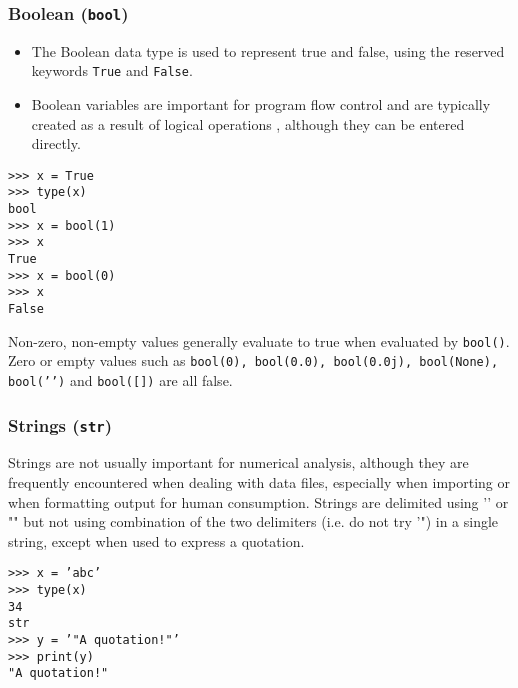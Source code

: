 \documentclass[KSmain.tex]{subfiles}
\begin{document}
\subsubsection{Boolean (\texttt{bool})}
\begin{itemize}
\item The Boolean data type is used to represent true and false, using the reserved keywords \texttt{True} and \texttt{False}.
\item Boolean variables are important for program flow control and are typically created as a
result of logical operations , although they can be entered directly.
\end{itemize}
\begin{framed}
\begin{verbatim}
>>> x = True
>>> type(x)
bool
>>> x = bool(1)
>>> x
True
>>> x = bool(0)
>>> x
False
\end{verbatim}
\end{framed}
Non-zero, non-empty values generally evaluate to true when evaluated by \texttt{bool()}. Zero or empty values
such as \texttt{bool(0), bool(0.0), bool(0.0j), bool(None), bool(’’)} and \texttt{bool([])} are all false.
\subsubsection{Strings (\texttt{str})}
\noindent Strings are not usually important for numerical analysis, although they are frequently encountered when
dealing with data files, especially when importing or when formatting output for human consumption.
Strings are delimited using ’’ or "" but not using combination of the two delimiters (i.e. do not try ’") in
a single string, except when used to express a quotation.
\begin{framed}
\begin{verbatim}
>>> x = ’abc’
>>> type(x)
34
str
>>> y = ’"A quotation!"’
>>> print(y)
"A quotation!"
\end{verbatim}
\end{framed}

\newpage
\end{document}
